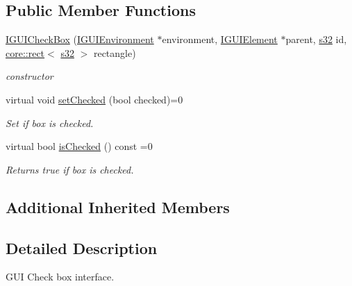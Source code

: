 \subsection*{Public Member Functions}
\begin{DoxyCompactItemize}
\item 
\mbox{\label{classirr_1_1gui_1_1IGUICheckBox_a6a9826188131ec1bf1d1ec22c3ce3393}} 
\hyperlink{classirr_1_1gui_1_1IGUICheckBox_a6a9826188131ec1bf1d1ec22c3ce3393}{I\+G\+U\+I\+Check\+Box} (\hyperlink{classirr_1_1gui_1_1IGUIEnvironment}{I\+G\+U\+I\+Environment} $\ast$environment, \hyperlink{classirr_1_1gui_1_1IGUIElement}{I\+G\+U\+I\+Element} $\ast$parent, \hyperlink{namespaceirr_ac66849b7a6ed16e30ebede579f9b47c6}{s32} id, \hyperlink{classirr_1_1core_1_1rect}{core\+::rect}$<$ \hyperlink{namespaceirr_ac66849b7a6ed16e30ebede579f9b47c6}{s32} $>$ rectangle)
\begin{DoxyCompactList}\small\item\em constructor \end{DoxyCompactList}\item 
\mbox{\label{classirr_1_1gui_1_1IGUICheckBox_ac57493d2d2ffbe820b0d634bd344d455}} 
virtual void \hyperlink{classirr_1_1gui_1_1IGUICheckBox_ac57493d2d2ffbe820b0d634bd344d455}{set\+Checked} (bool checked)=0
\begin{DoxyCompactList}\small\item\em Set if box is checked. \end{DoxyCompactList}\item 
\mbox{\label{classirr_1_1gui_1_1IGUICheckBox_a3c7bffd5a06af81ff894d08bdeaf72ca}} 
virtual bool \hyperlink{classirr_1_1gui_1_1IGUICheckBox_a3c7bffd5a06af81ff894d08bdeaf72ca}{is\+Checked} () const =0
\begin{DoxyCompactList}\small\item\em Returns true if box is checked. \end{DoxyCompactList}\end{DoxyCompactItemize}
\subsection*{Additional Inherited Members}


\subsection{Detailed Description}
G\+UI Check box interface. 

